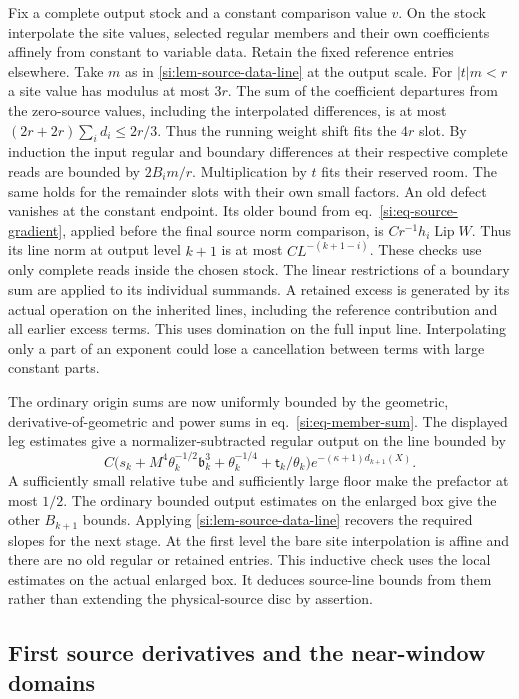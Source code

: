 \documentclass[11pt,letterpaper,reqno]{amsart}
\numberwithin{equation}{section}
\renewcommand{\eqref}[1]{\textup{eq.~\ref{#1}}}
\theoremstyle{definition}
\theoremstyle{remark}
\begin{document}
Fix a complete output stock and a constant comparison value
$v$. On the stock interpolate the site values, selected regular
members and their own coefficients affinely from constant to
variable data. Retain the fixed reference entries elsewhere.
Take $m$ as in \cref{si:lem-source-data-line} at the output scale.
For $|t|m<r$ a site value has modulus at most $3r$. The sum of
the coefficient departures from the zero-source values, including
the interpolated differences, is at most
$(2r+2r)\sum_i d_i\le2r/3$. Thus the running weight shift fits the
$4r$ slot. By induction the input regular and boundary differences
at their respective complete reads are bounded by $2B_i m/r$.
Multiplication by $t$ fits their reserved room. The same holds for
the remainder slots with their own small factors. An old defect
vanishes at the constant endpoint. Its older bound from
\eqref{si:eq-source-gradient}, applied before the final source
norm comparison, is $C r^{-1} h_i\operatorname{Lip}W$. Thus its
line norm at output level $k+1$ is at most $CL^{-(k+1-i)}$.
These checks use only complete reads inside the chosen stock. The
linear restrictions of a boundary sum are applied to its individual
summands. A retained excess is generated by its actual operation
on the inherited lines, including the reference contribution and
all earlier excess terms. This uses domination on the full input
line. Interpolating only a part of an exponent could lose a
cancellation between terms with large constant parts.

The ordinary origin sums are now uniformly bounded by the
geometric, derivative-of-geometric and power sums in
\eqref{si:eq-member-sum}. The displayed leg estimates give a
normalizer-subtracted regular output on the line bounded by
\[
 C\bigl(s_k+M^4\theta_k^{-1/2}\mathfrak b_k^3
                +\theta_k^{-1/4}+\mathsf t_k/\theta_k\bigr)
                     e^{-(\kappa+1)d_{k+1}(X)}.
\]
A sufficiently small relative tube and sufficiently large floor
make the prefactor at most $1/2$. The ordinary bounded output
estimates on the enlarged box give the other $B_{k+1}$ bounds.
Applying \cref{si:lem-source-data-line} recovers the required
slopes for the next stage. At the first level the bare site
interpolation is affine and there are no old regular or retained
entries. This inductive check uses the local estimates on the
actual enlarged box. It deduces source-line bounds from them
rather than extending the physical-source disc by assertion.

\subsection{First source derivatives and the near-window domains}
\label{si:subsec-near-source}
\end{document}
